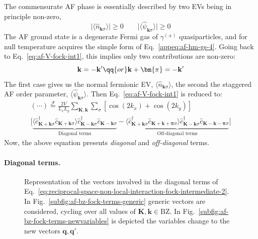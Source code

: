 The commensurate AF phase is essentially described by two EVs being in principle non-zero,
\[
	\big| 
		\langle
			\hat n_{\mathbf{k}\sigma}
		\rangle
	\big| \ge 0
	\qquad
	\big| 
		\langle
			\hat \psi_{\mathbf{k}\sigma}
		\rangle
	\big| \ge 0
\]
The AF ground state is a degenerate Fermi gas of $\gamma^{(\pm)}$ quasiparticles, and for null temperature acquires the simple form of Eq.~\eqref{appeq:af-hm-gs-4}. Going back to Eq.~\eqref{eq:af-V-fock-int1}, this implies only two contributions are non-zero:
\[
	\mathbf{k} = -\mathbf{k}'
	\qq{or}
	\mathbf{k}+\bm{\pi} = -\mathbf{k}'
\]
The first case gives us the normal fermionic EV, $\langle \hat n_{\mathbf{k}\sigma} \rangle$, the second the staggered AF order parameter, $\langle \hat \psi_{\mathbf{k}\sigma} \rangle$. Then Eq.~\eqref{eq:af-V-fock-int1} is reduced to:
\begin{multline}
	(\cdots) \stackrel{\mathcal{F}}{=} \frac{2V}{L_x L_y} \sum_{\mathbf{K}, \mathbf{k}} \sum_\sigma \left[
	\cos \left(
	2k_x
	\right)	+ \cos \left(
	2k_y
	\right)	
	\right]	\\
	\Big[
	\underbrace{
		\langle
		\hat c_{\mathbf{K}+\mathbf{k} \sigma}^\dagger 
		\hat 	c_{\mathbf{K}+\mathbf{k} \sigma}
		\rangle
		\hat c_{\mathbf{K}-\mathbf{k} \sigma}^\dagger  \hat c_{\mathbf{K}-\mathbf{k}\sigma}
	}_\text{Diagonal terms}
	-
	\underbrace{
		\langle
		\hat c_{\mathbf{K}+\mathbf{k} \sigma}^\dagger 
		\hat 	c_{\mathbf{K}+\mathbf{k}+\bm{\pi} \sigma}
		\rangle
		\hat c_{\mathbf{K}-\mathbf{k} \sigma}^\dagger  \hat c_{\mathbf{K}-\mathbf{k}-\bm{\pi}\sigma}
	}_\text{Off-diagonal terms}
	\Big] \label{eq:af-V-fock-int2}
\end{multline}
Now, the above equation presents \textit{diagonal} and \textit{off-diagonal} terms.

\paragraph{Diagonal terms.}

\begin{figure}
	\def\Kx{0.5}
	\def\Ky{0.2}
	\def\kx{0.1}
	\def\ky{0.7}
	\centering
	\caption{Representation of the vectors involved in the diagonal terms of Eq.~\eqref{eq:reciprocal-space-non-local-interaction-fock-intermediate-2}. In Fig.~\ref{subfig:af-bz-fock-terms-generic} generic vectors are considered, cycling over all values of $\mathbf{K},\mathbf{k}\in\mathrm{BZ}$. In Fig.~\ref{subfig:af-bz-fock-terms-newvariables} is depicted the variables change to the new vectors $\mathbf{q},\mathbf{q}'$.}
	\label{fig:af-bz-fock-terms}
\end{figure}

